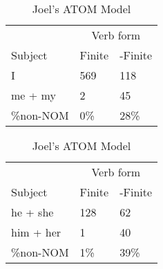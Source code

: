 \begin{table}[]
    \caption{Joel's ATOM Model}
    \begin{minipage}{0.5\textwidth}
    \centering
    \begin{tabular}{@{}lll@{}}
        \toprule
         &\multicolumn{2}{c}{Verb form}\\
         \cline{2-3}
        Subject & Finite & -Finite \\
        \midrule
        I & 569 & 118 \\
        me + my & 2 & 45 \\
        \hline
        \%non-NOM & 0\% & 28\% \\
        \bottomrule
    \end{tabular}
\end{minipage}
\begin{minipage}{0.5\textwidth}
    \centering
    \begin{tabular}{@{}lll@{}}
        \toprule
         &\multicolumn{2}{c}{Verb form}\\
         \cline{2-3}
        Subject & Finite & -Finite \\
        \midrule
        he + she & 128 & 62 \\
        him + her & 1 & 40 \\
        \hline
        \%non-NOM & 1\% & 39\% \\
        \bottomrule
    \end{tabular}
    \end{minipage}
    \begin{minipage}{0.5\textwidth}
    

\end{minipage}
\end{table}
